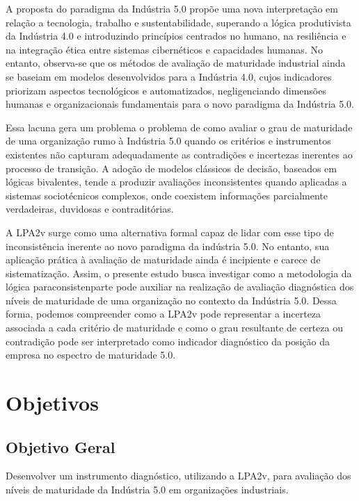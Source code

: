 A proposta do paradigma da Indústria 5.0 propõe uma nova interpretação em relação a tecnologia, trabalho e sustentabilidade, superando a lógica produtivista da Indústria 4.0 e introduzindo princípios centrados no humano, na resiliência e na integração ética entre sistemas cibernéticos e capacidades humanas.
No entanto, observa-se que os métodos de avaliação de maturidade industrial ainda se baseiam em modelos desenvolvidos para a Indústria 4.0, cujos indicadores priorizam aspectos tecnológicos e automatizados, negligenciando dimensões humanas e organizacionais fundamentais para o novo paradigma da Indústria 5.0.

Essa lacuna gera um problema o problema de como avaliar o grau de maturidade de uma organização rumo à Indústria 5.0 quando os critérios e instrumentos existentes não capturam adequadamente as contradições e incertezas inerentes ao processo de transição.
A adoção de modelos clássicos de decisão, baseados em lógicas bivalentes, tende a produzir avaliações inconsistentes quando aplicadas a sistemas sociotécnicos complexos, onde coexistem informações parcialmente verdadeiras, duvidosas e contraditórias.

A \gls{LPA2v} surge como uma alternativa formal capaz de lidar com esse tipo de inconsistência inerente ao novo paradigma da indústria 5.0.
No entanto, sua aplicação prática à avaliação de maturidade ainda é incipiente e carece de sistematização.
Assim, o presente estudo busca investigar como a metodologia da lógica paraconsistenparte pode auxiliar na realização de avaliação diagnóstica dos níveis de maturidade de uma organização no contexto da Indústria 5.0.
Dessa forma, podemos compreender como a \gls{LPA2v} pode representar a incerteza associada a cada critério de maturidade e como o grau resultante de certeza ou contradição pode ser interpretado como indicador diagnóstico da posição da empresa no espectro de maturidade 5.0.

\section{Objetivos}

\subsection{Objetivo Geral}

Desenvolver um instrumento diagnóstico, utilizando a \gls{LPA2v}, para avaliação dos níveis de maturidade da Indústria 5.0 em organizações industriais.

